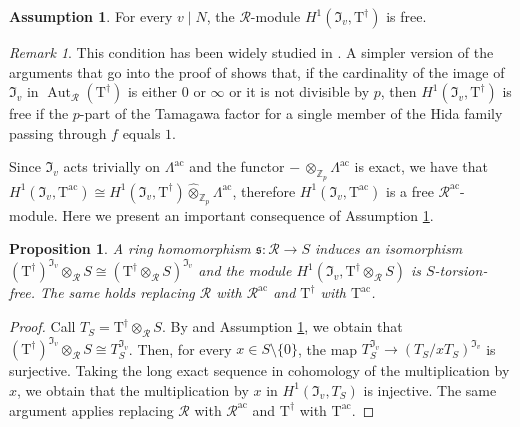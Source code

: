 \documentclass[12pt,reqno]{amsart}
\newtheorem{proposition}[theorem]{Proposition}
\theoremstyle{definition}
\newtheorem{assumption}[theorem]{Assumption}
\theoremstyle{remark}
\newtheorem{remark}[theorem]{Remark}
\newcommand{\numberset}{\mathbb}
\newcommand{\Z}{\numberset{Z}}
\newcommand{\T}{\boldsymbol{\mathrm{T}}}
\DeclareMathOperator{\Aut}{Aut}
\newcommand{\ac}{\mathrm{ac}}
\newcommand{\gL}{\Lambda}
\begin{document}
\begin{assumption}\label{ass:tamagawa-factors-at-N}
    For every $v\mid N$, the $\mathcal{R}$-module $H^1(\mathfrak{I}_v,\T^{\dag})$ is free.
\end{assumption}

\begin{remark}
    This condition has been widely studied in \cite[§4.3]{Buyukboduk-Sakamoto25:on-the-artin-formalism}. A simpler version of the arguments that go into the proof of \cite[Proposition 4.30]{Buyukboduk-Sakamoto25:on-the-artin-formalism} shows that, if the cardinality of the image of $\mathfrak{I}_v$ in $\Aut_{\mathcal{R}}(\T^\dag)$ is either $0$ or $\infty$ or it is not divisible by $p$, then $H^1(\mathfrak{I}_v,\T^{\dag})$ is free if the $p$-part of the Tamagawa factor for a single member of the Hida family passing through $f$ equals $1$.
\end{remark}

Since $\mathfrak{I}_v$ acts trivially on $\gL^{\ac}$ and the functor $-\ \hat{\otimes}_{{\Z}_p}\gL^{\ac}$ is exact, we have that $H^1(\mathfrak{I}_v,\T^{\ac})\cong H^1(\mathfrak{I}_v,\T^{\dag})\hat{\otimes}_{\Z_p}\gL^{\ac}$, therefore $H^1(\mathfrak{I}_v,\T^{\ac})$ is a free $\mathcal{R}^{\ac}$-module. Here we present an important consequence of Assumption \ref{ass:tamagawa-factors-at-N}.

\begin{proposition}\label{prop:tamagawa-numbers-at-N}
    A ring homomorphism $\mathfrak{s}\colon \mathcal{R}\to S$ induces an isomorphism $(\T^\dag)^{\mathfrak{I}_v}\otimes_{\mathcal{R}}S\cong (\T^{\dag}\otimes_{\mathcal{R}} S)^{\mathfrak{I}_v}$ and the module $H^1(\mathfrak{I}_v,\T^{\dag}\otimes_{\mathcal{R}}S)$ is $S$-torsion-free. The same holds replacing $\mathcal{R}$ with $\mathcal{R}^{\ac}$ and $\T^{\dag}$ with $\T^{\ac}$.
\end{proposition}
\begin{proof}
    Call $T_S=\T^{\dag}\otimes_{\mathcal{R}}S$. By \cite[Proposition 4.17]{Buyukboduk-Sakamoto25:on-the-artin-formalism} and Assumption \ref{ass:tamagawa-factors-at-N}, we obtain that $(\T^{\dag})^{\mathfrak{I}_v}\otimes_{\mathcal{R}}S\cong T_S^{\mathfrak{I}_v}$. Then, for every $x\in S\setminus\{0\}$, the map $T_S^{\mathfrak{I}_v}\to (T_S/xT_S)^{\mathfrak{I}_v}$ is surjective. Taking the long exact sequence in cohomology of the multiplication by $x$, we obtain that the multiplication by $x$ in $H^1(\mathfrak{I}_v,T_S)$ is injective. The same argument applies replacing $\mathcal{R}$ with $\mathcal{R}^{\ac}$ and $\T^{\dag}$ with $\T^{\ac}$.
\end{proof}
\end{document}
